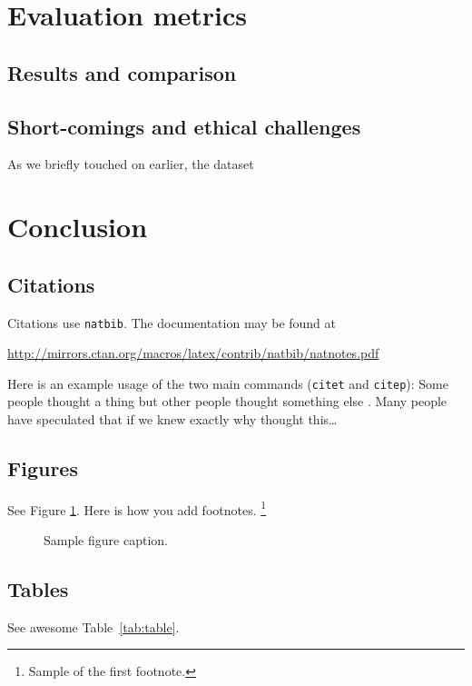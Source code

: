 \documentclass{article}
\begin{document}
\section{Evaluation metrics}

\subsection{Results and comparison}

\subsection{Short-comings and ethical challenges}
As we briefly touched on earlier, the dataset 

\section{Conclusion}

\subsection{Citations}
Citations use \verb+natbib+. The documentation may be found at
\begin{center}
	\url{http://mirrors.ctan.org/macros/latex/contrib/natbib/natnotes.pdf}
\end{center}

Here is an example usage of the two main commands (\verb+citet+ and \verb+citep+): Some people thought a thing \citep{kour2014real, hadash2018estimate} but other people thought something else \citep{kour2014fast}. Many people have speculated that if we knew exactly why \citet{kour2014fast} thought this\dots

\subsection{Figures}
\lipsum[10]
See Figure \ref{fig:fig1}. Here is how you add footnotes. \footnote{Sample of the first footnote.}
\lipsum[11]

\begin{figure}
	\centering
	\fbox{\rule[-.5cm]{4cm}{4cm} \rule[-.5cm]{4cm}{0cm}}
	\caption{Sample figure caption.}
	\label{fig:fig1}
\end{figure}

\subsection{Tables}
See awesome Table~\ref{tab:table}.
\end{document}
